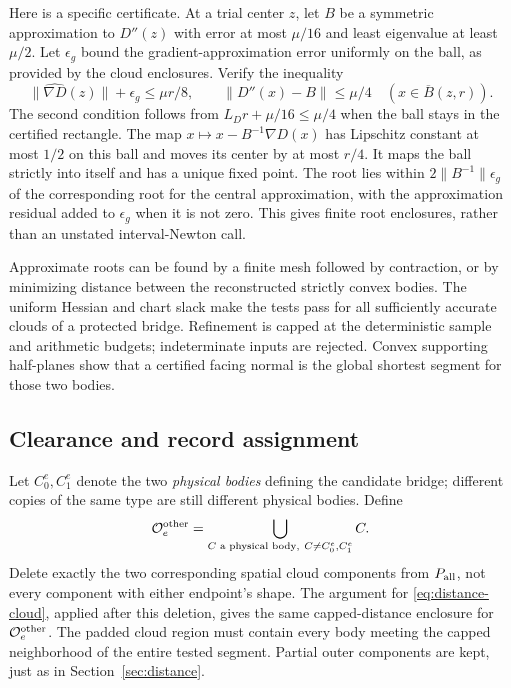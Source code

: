 Here is a specific certificate. At a trial center $z$, let $B$ be a
symmetric approximation to $D''(z)$ with error at most $\mu/16$ and
least eigenvalue at least $\mu/2$. Let $\epsilon_g$ bound the gradient-approximation error uniformly
on the ball, as provided by the cloud enclosures. Verify
the inequality
\begin{equation}\label{eq:newton-test}
 \|\widehat{\nabla D}(z)\|+\epsilon_g\le\mu r/8,
 \qquad \|D''(x)-B\|\le\mu/4\quad(x\in\overline B(z,r)).
\end{equation}
The second condition follows from $L_Dr+\mu/16\le\mu/4$ when the
ball stays in the certified rectangle. The map
$x\mapsto x-B^{-1}\nabla D(x)$ has Lipschitz constant at most $1/2$
on this ball and moves its center by at most $r/4$. It maps the ball
strictly into itself and has a unique fixed point. The root lies within
$2\|B^{-1}\|\epsilon_g$ of the corresponding root for the central
approximation, with the approximation residual added to $\epsilon_g$
when it is not zero. This gives finite root enclosures, rather than an
unstated interval-Newton call.

Approximate roots can be found by a finite mesh followed by contraction,
or by minimizing distance between the reconstructed strictly convex
bodies. The uniform Hessian and chart slack make the tests pass for all
sufficiently accurate clouds of a protected bridge. Refinement is capped
at the deterministic sample and arithmetic budgets; indeterminate inputs
are rejected. Convex supporting half-planes show that a certified facing
normal is the global shortest segment for those two bodies.

\subsection{Clearance and record assignment}
Let $C_0^e,C_1^e$ denote the two \emph{physical bodies} defining the
candidate bridge; different copies of the same type are still different
physical bodies. Define
\[
 \mathcal O_e^{\rm other}
  =\bigcup_{C\text{ a physical body},\ C\ne C_0^e,C_1^e} C.
\]
Delete exactly the two corresponding spatial cloud components from
$P_{\rm all}$, not every component with either endpoint's shape. The
argument for \eqref{eq:distance-cloud}, applied after this deletion,
gives the same capped-distance enclosure for $\mathcal O_e^{\rm other}$.
The padded cloud region must contain every body meeting the capped
neighborhood of the entire tested segment. Partial outer components are
kept, just as in Section~\ref{sec:distance}.


